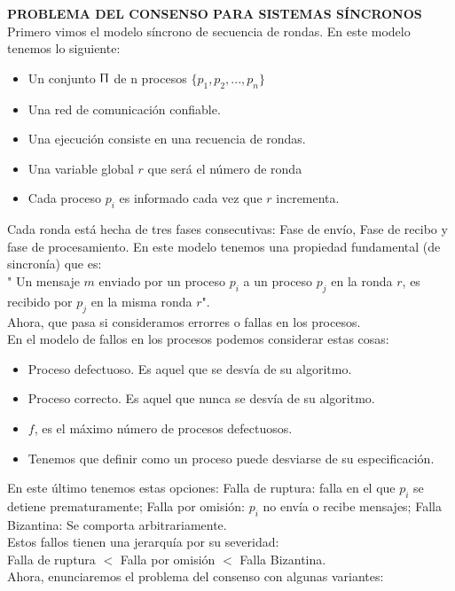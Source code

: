 \documentclass{article}
\begin{document}
\begin{enumerate}
{      \textbf{PROBLEMA DEL CONSENSO PARA SISTEMAS SÍNCRONOS}\\
      Primero vimos el modelo síncrono de secuencia de rondas.
      En este modelo tenemos lo siguiente:
      \begin{itemize}
        \item Un conjunto $\Uppi$ de n procesos $\{p_{1}, p_{2}, ..., p_{n}\}$
        \item Una red de comunicación confiable.
        \item Una ejecución consiste en una recuencia de rondas.
        \item Una variable global $r$ que será el número de ronda
        \item Cada proceso $p_{i}$ es informado cada vez que $r$ incrementa.
      \end{itemize}
      Cada ronda está hecha de tres fases consecutivas: Fase de envío, Fase de recibo y fase de procesamiento.
      En este modelo tenemos una propiedad fundamental (de sincronía) que es:\\
      " Un mensaje $m$ enviado por un proceso $p_{i}$ a un proceso $p_{j}$ en la ronda
      $r$, es recibido por $p_{j}$ en la misma ronda $r$".\\
      Ahora, que pasa si consideramos errorres o fallas en los procesos.\\
      En el modelo de fallos en los procesos podemos considerar estas cosas:
      \begin{itemize}
        \item Proceso defectuoso. Es aquel que se desvía de su algoritmo.
        \item Proceso correcto. Es aquel que nunca se desvía de su algoritmo.
        \item $f$, es el máximo número de procesos defectuosos.
        \item Tenemos que definir como un proceso puede desviarse de su especificación.
      \end{itemize}
       En este último tenemos estas opciones: Falla de ruptura: falla en el que $p_{i}$
       se detiene prematuramente; Falla por omisión: $p_{i}$ no envía o recibe 
       mensajes; Falla Bizantina: Se comporta arbitrariamente.\\
       Estos fallos tienen una jerarquía por su severidad:\\
       Falla de ruptura $<$ Falla por omisión $<$ Falla Bizantina.\\
       Ahora, enunciaremos el problema del consenso con algunas variantes:\\
}
\end{enumerate}
\end{document}
